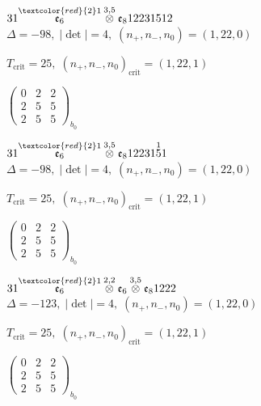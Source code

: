 \documentclass[10pt]{article}
\begin{document}
\smallskip

$31\overset{\textcolor{red}{2}1}{\mathfrak{e}_6}\overset{3,5}{\otimes}\mathfrak{e}_812231512$ \quad $\Delta=-98,\; |\det|=4,\; (n_+,n_-,n_0)=(1,22,0)$

\hspace{1em}$T_{\text{crit}}=25,\; (n_+,n_-,n_0)_{\text{crit}}=(1,22,1)$

\hspace{2em}$\left(\begin{smallmatrix}0 & 2 & 2 \\ 2 & 5 & 5 \\ 2 & 5 & 5\end{smallmatrix}\right)_{\!b_0}$

\smallskip

$31\overset{\textcolor{red}{2}1}{\mathfrak{e}_6}\overset{3,5}{\otimes}\mathfrak{e}_812231\overset{1}{5}1$ \quad $\Delta=-98,\; |\det|=4,\; (n_+,n_-,n_0)=(1,22,0)$

\hspace{1em}$T_{\text{crit}}=25,\; (n_+,n_-,n_0)_{\text{crit}}=(1,22,1)$

\hspace{2em}$\left(\begin{smallmatrix}0 & 2 & 2 \\ 2 & 5 & 5 \\ 2 & 5 & 5\end{smallmatrix}\right)_{\!b_0}$

\smallskip

$31\overset{\textcolor{red}{2}1}{\mathfrak{e}_6}\overset{2,2}{\otimes}\mathfrak{e}_6\overset{3,5}{\otimes}\mathfrak{e}_81222$ \quad $\Delta=-123,\; |\det|=4,\; (n_+,n_-,n_0)=(1,22,0)$

\hspace{1em}$T_{\text{crit}}=25,\; (n_+,n_-,n_0)_{\text{crit}}=(1,22,1)$

\hspace{2em}$\left(\begin{smallmatrix}0 & 2 & 2 \\ 2 & 5 & 5 \\ 2 & 5 & 5\end{smallmatrix}\right)_{\!b_0}$
\end{document}
